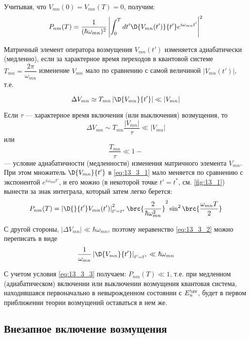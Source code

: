 Учитывая, что $V_{mn}(0) = V_{mn}(T) = 0$, получим:
\begin{equation}
\label{eq:13_3_1}
P_{nm}(T) = \frac{1}{(\hbar \omega_{mn})^2} \left| \int_0^T dt' \D{V_{mn}(t')}{t'} e^{i\omega_{mn}t'}\right|^2
\end{equation}

\begin{defn}
Матричный элемент оператора возмущения $V_{mn}(t')$ изменяется адиабатически (медленно), если за характерное время переходов в квантовой системе $T_{mn} = \dfrac{2\pi}{\omega_{mn}}$ изменение $V_{mn}$ мало по сравнению с самой величиной $|V_{mn}(t')|$, т.е.
\end{defn}
\begin{equation}
\label{eq:13_3_2}
\Delta V_{mn}  \simeq T_{mn} \left| \D{V_{mn}}{t'}\right| \ll |V_{mn}|
\end{equation}

Если $\tau$ --- характерное время включения (или выключения) возмущения, то
$$
\Delta V_{mn} \sim T_{mn} \frac{|V_{mn}|}{\tau} \ll |V_{mn}| 
$$
или
$$
\boxed{\frac{T_{mn}}{\tau} \ll 1} - 
$$
--- условие адиабатичности (медленности) изменения матричного элемента $V_{mn}$. При этом множитель $\D{V_{mn}}{t'}$ в \eqref{eq:13_3_1} мало меняется по сравнению с экспонентой $e^{i\omega_{mn} t'}$, и его можно (в некоторой точке $t' = t^*$, см. \autoref{fig:13_1}) вынести за знак интеграла, который затем легко берется:
$$
P_{nm}(T) = \left| \D{}{t'} V_{mn}(t')\right|_{t' = t^*}^2 \brc{\frac{2}{\hbar \omega_{mn}^2}}^2 \sin^2 \brc{\frac{\omega_{mn}T}{2}}
$$

С другой стороны, $|\Delta V_{mn}| \ll \hbar \omega_{mn}$, поэтому неравенство \eqref{eq:13_3_2} можно переписать в виде
\begin{equation}
\label{eq:13_3_3}
\frac{1}{\omega_{mn}} \left| \D{V_{mn}}{t'}\right|_{t' = t^*} \ll \hbar \omega_{mn}
\end{equation}

С учетом условия \eqref{eq:13_3_3} получаем: $\boxed{P_{nm}(T) \ll 1}$, т.е. при медленном (адиабатическом) включении или выключении возмущения квантовая система, находившаяся первоначально в невырожденном состоянии с $E_n^\zr$, будет в первом приближении теории возмущений оставаться в нем же.

\subsection{Внезапное включение возмущения}

